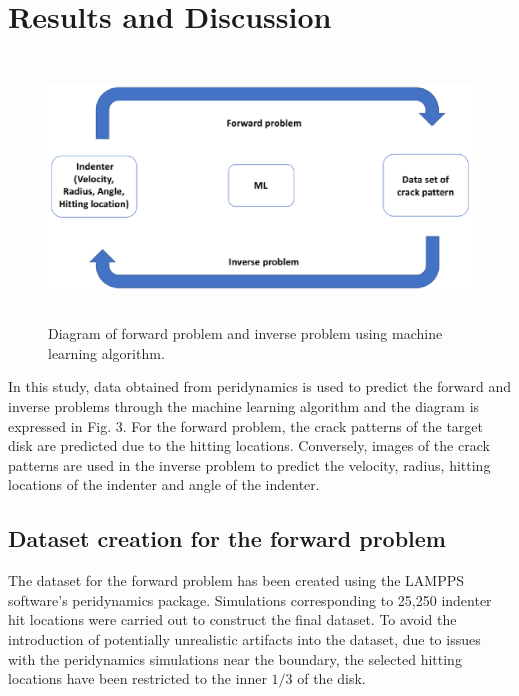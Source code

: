 \section{Results and Discussion}
\label{sec:4}


\begin{figure}
  \includegraphics[width=12cm, height=7cm]{figure/diagram.eps}

\caption{Diagram of forward problem and inverse problem using machine learning algorithm.}
\label{fig:3}       
\end{figure}

In this study, data obtained from peridynamics is used to predict the forward and inverse problems through the machine learning algorithm and the diagram is expressed in Fig. 3. For the forward problem, the crack patterns of the target disk are predicted due to the hitting locations. Conversely, images of the crack patterns are used in the inverse problem to predict the velocity, radius, hitting locations of the indenter and angle of the indenter.

\subsection{Dataset creation for the forward problem}
\label{forward_data}

The dataset for the forward problem has been created using the LAMPPS software's peridynamics package.  Simulations corresponding to  25,250 indenter hit locations were carried out to construct the final dataset.  To avoid the introduction of potentially unrealistic artifacts into the dataset, due to issues with the peridynamics simulations near the boundary, the selected hitting locations have been restricted to the inner $1/3$ of the disk.


